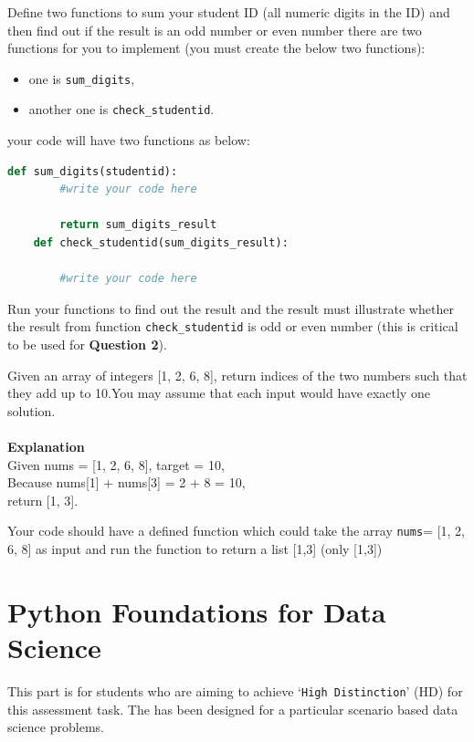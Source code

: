 \documentclass[a4paper]{article}
\begin{document}
    \begin{answer}[Question 1.7]
    Define two functions to sum your student ID (all numeric digits in the ID) and then find out if the result is an odd number or even number
    there are two functions for you to implement (you must create the below two functions):
    \begin{itemize}
        \item one is \texttt{sum_digits},
        \item another one is \texttt{check_studentid}.
    \end{itemize}
    your code will have two functions as below:

    \begin{lstlisting}[language=Python]
    def sum_digits(studentid):
        #write your code here

        return sum_digits_result
    def check_studentid(sum_digits_result):

        #write your code here
    \end{lstlisting}
   Run your functions to find out the result and the result must illustrate whether the result from function \texttt{check_studentid} is odd or even number (this is critical to be used for \textbf{Question 2}).
    \end{answer}


    \begin{answer}[Question 1.8]
    Given an array of integers [1, 2, 6, 8], return indices of the two numbers such that they add up to 10.You may assume that each input would have exactly one solution. \\
    \\
    \textbf{Explanation} \\
    Given nums = [1, 2, 6, 8], target = 10, \\
    Because nums[1] + nums[3] = 2 + 8 = 10, \\
    return [1, 3].

    Your code should have a defined function which could take the array \texttt{nums}= [1, 2, 6, 8] as input and run the function to return a list [1,3] (only [1,3])
    \end{answer}

    \part{Python Foundations for Data Science}\label{sec:part2}

    This part is for students who are aiming to
    achieve `\texttt{High Distinction}' (HD) for this assessment task. The  has been designed for a particular scenario based data science problems.
\end{document}
